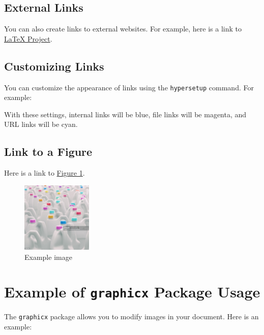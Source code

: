 \documentclass[]{article}
\begin{document}
\subsection{External Links}

You can also create links to external websites. For example, here is a link to \href{https://www.latex-project.org/}{LaTeX Project}.

\subsection{Customizing Links}

You can customize the appearance of links using the \texttt{hypersetup} command. For example:

\hypersetup{
    colorlinks=true,
    linkcolor=blue,
    filecolor=magenta,      
    urlcolor=cyan,
}

With these settings, internal links will be blue, file links will be magenta, and URL links will be cyan.

\subsection{Link to a Figure}

Here is a link to \hyperref[fig:example]{Figure 1}.

\begin{figure}[!ht]
    \centering
    \includegraphics[width=0.3\textwidth]{assets/example-image.jpg}
    \caption{Example image}
    \label{fig:example}
\end{figure}
\pagebreak
\section{Example of \texttt{graphicx} Package Usage}

The \texttt{graphicx} package allows you to modify images in your document. Here is an example:
\end{document}
